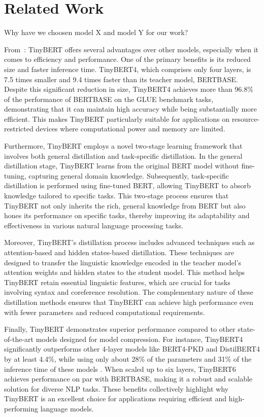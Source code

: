 \section{Related Work}

Why have we choosen model X and model Y for our work?

From~\cite{jiao20}: TinyBERT offers several advantages over other models, especially when it comes to efficiency and performance. One of the primary benefits is its reduced size and faster inference time. TinyBERT4, which comprises only four layers, is 7.5 times smaller and 9.4 times faster than its teacher model, BERTBASE. Despite this significant reduction in size, TinyBERT4 achieves more than 96.8\% of the performance of BERTBASE on the GLUE benchmark tasks, demonstrating that it can maintain high accuracy while being substantially more efficient. This makes TinyBERT particularly suitable for applications on resource-restricted devices where computational power and memory are limited.

Furthermore, TinyBERT employs a novel two-stage learning framework that involves both general distillation and task-specific distillation. In the general distillation stage, TinyBERT learns from the original BERT model without fine-tuning, capturing general domain knowledge. Subsequently, task-specific distillation is performed using fine-tuned BERT, allowing TinyBERT to absorb knowledge tailored to specific tasks. This two-stage process ensures that TinyBERT not only inherits the rich, general knowledge from BERT but also hones its performance on specific tasks, thereby improving its adaptability and effectiveness in various natural language processing tasks.

Moreover, TinyBERT's distillation process includes advanced techniques such as attention-based and hidden states-based distillation. These techniques are designed to transfer the linguistic knowledge encoded in the teacher model's attention weights and hidden states to the student model. This method helps TinyBERT retain essential linguistic features, which are crucial for tasks involving syntax and coreference resolution. The complementary nature of these distillation methods ensures that TinyBERT can achieve high performance even with fewer parameters and reduced computational requirements.

Finally, TinyBERT demonstrates superior performance compared to other state-of-the-art models designed for model compression. For instance, TinyBERT4 significantly outperforms other 4-layer models like BERT4-PKD and DistilBERT4 by at least 4.4\%, while using only about 28\% of the parameters and 31\% of the inference time of these models . When scaled up to six layers, TinyBERT6 achieves performance on par with BERTBASE, making it a robust and scalable solution for diverse NLP tasks. These benefits collectively highlight why TinyBERT is an excellent choice for applications requiring efficient and high-performing language models.\\


